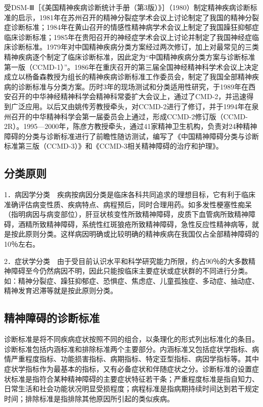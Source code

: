 受DSM-Ⅲ［《美国精神疾病诊断统计手册（第3版）》］（1980）制定精神疾病诊断标准的启示，1981年在苏州召开的精神分裂症学术会议上讨论制定了我国的精神分裂症诊断标准；1984年在黄山召开的情感性精神病学术会议上制定了我国躁狂抑郁症临床诊断标准；1985年在贵阳召开的神经症学术会议上讨论并制定了我国神经症临床诊断标准。1979年对中国精神疾病分类方案经过两次修订，加上对最常见的三类精神疾病逐个制定了临床诊断标准，因此定为“中国精神疾病分类方案与诊断标准第一版（CCMD-1）”。1986年在重庆召开的第三届全国神经精神科学术会议上决定成立以杨备森教授为组长的精神疾病诊断标准工作委员会，制定了我国全部精神疾病的诊断标准与分类方案。历时3年的现场测试和分类适用性研究，于1989年在西安召开的中华神经精神科学会精神科常委扩大会议上，通过了CMD-2，并迅速得到广泛应用。以后又由姚传芳教授牵头，对CCMD-2进行了修订，并于1994年在泉州召开的中华精神科学会第一届委员会上通过，形成CCMD-2修订版（CCMD-2R）。1995---2000年，陈彦方教授牵头，通过41家精神卫生机构，负责对24种精神障碍的分类与诊断标准进行了前瞻性随访测试，编写了《中国精神障碍分类与诊断标准第三版（CCMD-3）》和《CCMD-3相关精神障碍的治疗和护理》。

\subsection{分类原则}

1．病因学分类　疾病按病因分类是临床各科共同追求的理想目标，它有利于临床准确评估病变性质、疾病特点、病程预后，同时合理用药。如多发性梗塞性痴呆（指明病因与病变部位），肝豆状核变性所致精神障碍，皮质下血管病所致精神障碍，酒精所致精神障碍，系统性红斑狼疮所致精神障碍，急性反应性精神病等，就是按此原则分类。这样病因明确或比较明确的精神疾病在我国仅占全部精神障碍的10％左右。

2．症状学分类　由于受目前认识水平和科学研究能力所限，约占90％的大多数精神障碍至今仍然病因不明，因此只能按临床主要症状或症状群的不同进行分类。如：精神分裂症、躁狂抑郁症、恐惧症、焦虑症、儿童孤独症、多动症、抽动症、精神发育迟滞等就是按此原则分类。

\subsection{精神障碍的诊断标准}

诊断标准是将不同疾病症状按照不同的组合，以条理化的形式列出标准化的条目。诊断标准包括内涵标准和排除标准两个主要部分。内涵标准又包括症状学指标、病情严重程度指标、功能损害指标、病期指标、特定亚型指标、病因学指标等。其中症状学指标作为最基本的指标，又有必备症状和伴随症状之分。诊断标准的设置症状标准是指符合某种精神障碍的主要症状特征若干条；严重程度标准是指自知力、日常生活和社会功能状况明显受损程度；病程标准是指病期持续时间达到若干规定时间；排除标准是指排除其他原因所引起的类似疾病。

